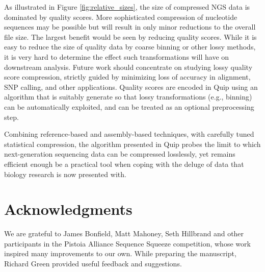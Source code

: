\documentclass[a4,center,fleqn]{NAR}
\begin{document}
As illustrated in Figure \ref{fig:relative_sizes}, the size of compressed NGS
data is dominated by quality scores. More sophisticated compression of
nucleotide sequences may be possible but will result in only minor reductions
to the overall file size. The largest benefit would be seen by reducing
quality scores. While it is easy to reduce the size of quality data by coarse
binning or other lossy methods, it is very hard to determine the effect such
transformations will have on downstream analysis. Future work should
concentrate on studying lossy quality score compression, strictly guided by
minimizing loss of accuracy in alignment, SNP calling, and other applications.
Quality scores are encoded in Quip using an algorithm that is suitably
generate so that lossy transformations (e.g., binning) can be automatically
exploited, and can be treated as an optional preprocessing step.

Combining reference-based and assembly-based techniques, with carefully tuned
statistical compression, the algorithm presented in Quip probes the limit to
which next-generation sequencing data can be compressed losslessly, yet
remains efficient enough be a practical tool when coping with the deluge of
data that biology research is now presented with.

\section{Acknowledgments}

We are grateful to James Bonfield, Matt Mahoney, Seth Hillbrand and other
participants in the Pistoia Alliance Sequence Squeeze competition, whose work
inspired many improvements to our own. While preparing the manuscript, Richard
Green provided useful feedback and suggestions.



\end{document}
